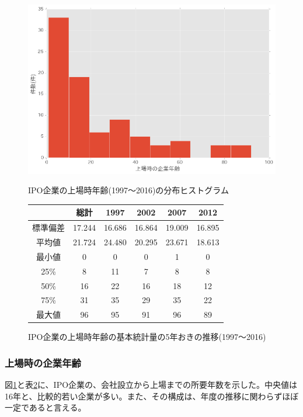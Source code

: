 \documentclass{jsarticle}
\begin{document}
\begin{figure}[!h]
  \begin{center}
  \caption{IPO企業の上場時年齢(1997〜2016)の分布ヒストグラム}
    \includegraphics[clip,width=14cm]{./age.png}
    \label{agehist}
  \end{center}
\end{figure}

\begin{figure}[!h]
  \begin{center}
  \caption{IPO企業の上場時年齢の基本統計量の5年おきの推移(1997〜2016)}
\begin{tabular}{cccccc}
\hline
\  & 総計 & 1997 & 2002 & 2007 & 2012  \\
 \hline \hline
標準偏差 & 17.244 & 16.686 & 16.864 & 19.009 & 16.895   \\
\hline
平均値 & 21.724 & 24.480 & 20.295 & 23.671 & 18.613   \\
\hline
最小値 & 0 & 0 & 0 & 1 & 0   \\
25\% & 8 & 11 & 7 & 8 & 8   \\
50\% & 16 & 22 & 16 & 18 & 12   \\
75\% & 31 & 35 & 29 & 35 & 22   \\
最大値 & 96 & 95 & 91 & 96 & 89   \\
\hline
	\end{tabular}
	\label{age} 
  \end{center}
\end{figure}

\newpage

\subsubsection{上場時の企業年齢}
図\ref{agehist}と表\ref{age}に、IPO企業の、会社設立から上場までの所要年数を示した。中央値は16年と、比較的若い企業が多い。また、その構成は、年度の推移に関わらずほぼ一定であると言える。
\end{document}
